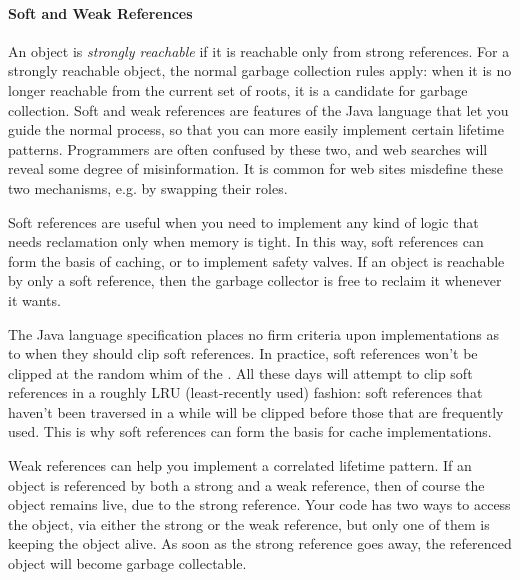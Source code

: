 \paragraph{Soft and Weak References}



An object is \emph{strongly reachable} if it is reachable only from strong
references. For a strongly reachable object, the normal garbage collection rules
apply: when it is no longer reachable from the current set of roots, it is a
candidate for garbage collection. Soft and weak references are features of the
Java language that let you guide the normal process, so that you can more easily
implement certain lifetime patterns. Programmers are often confused by these
two, and web searches will reveal some degree of misinformation. It is common
for web sites misdefine these two mechanisms, e.g. by swapping their roles.

Soft references are useful when you need to implement any kind of logic that
needs reclamation only when memory is tight. In this way, soft references can
form the basis of caching, or to implement safety
valves. If an object is reachable by only a soft reference,
then the garbage collector is free to reclaim it whenever it wants.

The Java language specification places no firm criteria upon \jre
implementations as to when they should clip soft references. In practice, soft
references won't be clipped at the random whim of the \jre. All \jres these days
will attempt to clip soft references in a roughly LRU (least-recently used)
fashion: soft references that haven't been traversed in a while will be clipped
before those that are frequently used. This is why soft references can form the
basis for cache implementations.

Weak references can help you implement a correlated lifetime pattern. If an
object is referenced by both a strong and a weak reference, then of course the
object remains live, due to the strong reference. Your code has two ways to
access the object, via either the strong or the weak reference, but only one of
them is keeping the object alive. As soon as the strong reference goes away, the
referenced object will become garbage collectable.


